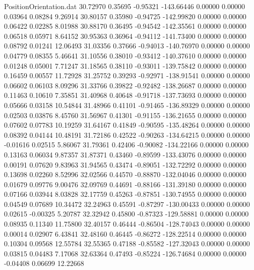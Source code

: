 \begin{filecontents}{PositionOrientation.dat}
  30.72970    0.35695   -0.95321  -143.66446    0.00000    0.00000    0.03964    0.08284    9.26914
  30.80157    0.35980   -0.94725  -142.99820    0.00000    0.00000    0.06422    0.02285    8.01988
  30.88170    0.36495   -0.94542  -142.35561    0.00000    0.00000    0.06518    0.05971    8.64152
  30.95363    0.36964   -0.94112  -141.73400    0.00000    0.00000    0.08792    0.01241   12.06493
  31.03356    0.37666   -0.94013  -140.76970    0.00000    0.00000    0.04779    0.08355    5.46641
  31.10556    0.38010   -0.93412  -140.37610    0.00000    0.00000    0.01248    0.05001    7.71247
  31.18565    0.38110   -0.93011  -139.75842    0.00000    0.00000    0.16459    0.00557   11.72928
  31.25752    0.39293   -0.92971  -138.91541    0.00000    0.00000    0.06602    0.06103    8.09296
  31.33766    0.39822   -0.92482  -138.26687    0.00000    0.00000    0.11463    0.10610    7.35851
  31.40968    0.40648   -0.91718  -137.73693    0.00000    0.00000    0.05666    0.03158   10.54844
  31.48966    0.41101   -0.91465  -136.89329    0.00000    0.00000    0.02503    0.03876    8.45760
  31.56967    0.41301   -0.91155  -136.21655    0.00000    0.00000    0.07602    0.07783   10.19259
  31.64167    0.41849   -0.90595  -135.48264    0.00000    0.00000    0.08392    0.04144   10.48191
  31.72186    0.42522   -0.90263  -134.64215    0.00000    0.00000   -0.01616    0.02515    5.86067
  31.79361    0.42406   -0.90082  -134.22166    0.00000    0.00000    0.13163    0.06034    9.87357
  31.87371    0.43460   -0.89599  -133.43076    0.00000    0.00000    0.00191    0.07620    9.83963
  31.94565    0.43474   -0.89051  -132.72292    0.00000    0.00000    0.13698    0.02260    8.52996
  32.02566    0.44570   -0.88870  -132.04046    0.00000    0.00000    0.01679    0.09776    9.00476
  32.09769    0.44691   -0.88166  -131.39180    0.00000    0.00000    0.07166    0.03944    8.03828
  32.17759    0.45263   -0.87851  -130.74955    0.00000    0.00000    0.04549    0.07689   10.34472
  32.24963    0.45591   -0.87297  -130.00433    0.00000    0.00000    0.02615   -0.00325    5.20787
  32.32942    0.45800   -0.87323  -129.58881    0.00000    0.00000    0.08935    0.11340   11.75800
  32.40157    0.46444   -0.86504  -128.74043    0.00000    0.00000    0.00014    0.02907    6.43841
  32.48160    0.46445   -0.86272  -128.22514    0.00000    0.00000    0.10304    0.09568   12.55784
  32.55365    0.47188   -0.85582  -127.32043    0.00000    0.00000    0.03815    0.04483    7.17068
  32.63364    0.47493   -0.85224  -126.74684    0.00000    0.00000   -0.04408    0.06699   12.22668

\end{filecontents}
